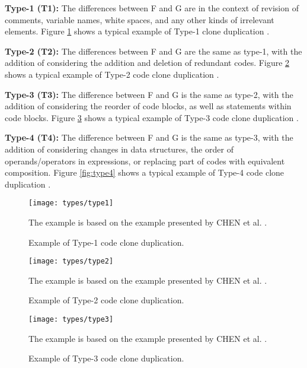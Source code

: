 \begin{itemize}
	\begin{item}
		\textbf{Type-1 (T1):} The differences between F and G are in the context of revision of comments, variable names,
		white spaces, and any other kinds of irrelevant elements. Figure
		\ref{fig:type1} shows a typical example of Type-1 clone duplication 
		\citep{litreview}. 
	\end{item}
	\begin{item}
		\textbf{Type-2 (T2):} The differences between F and G are the same as type-1, with the addition of 
		considering the addition and deletion of redundant codes. Figure
		\ref{fig:type2} shows a typical example of Type-2 code clone duplication  \citep{litreview}. 
	\end{item}
	\begin{item}
		\textbf{Type-3 (T3):} The difference between F and G is the same as type-2, with the addition of considering 
		the reorder of code blocks, as well as statements within code blocks. Figure
		\ref{fig:type3} shows a typical example of 
		Type-3 code clone duplication \citep{litreview}. 
	\end{item}
	\begin{item}
		\textbf{Type-4 (T4):} The difference between F and G is the same as type-3, with the addition of considering 
		changes in data structures, the order of operands/operators in expressions, or replacing part of codes 
		with equivalent composition. Figure
		\ref{fig:type4} shows a typical example of Type-4 code clone duplication \citep{litreview}. 
	\end{item}

\end{itemize}

\begin{figure}
\texttt{[image: types/type1]}
\caption{Example of Type-1 code clone duplication.}
The example is based on the example presented by CHEN et al. \citep{litreview}. 
\label{fig:type1}
\end{figure}

\begin{figure}
\texttt{[image: types/type2]}
\caption{Example of Type-2 code clone duplication.}
The example is based on the example presented by CHEN et al. \citep{litreview}. 
\label{fig:type2}
\end{figure}

\begin{figure}
\texttt{[image: types/type3]}
\caption{Example of Type-3 code clone duplication.}
The example is based on the example presented by CHEN et al. \citep{litreview}. 
\label{fig:type3}
\end{figure}


